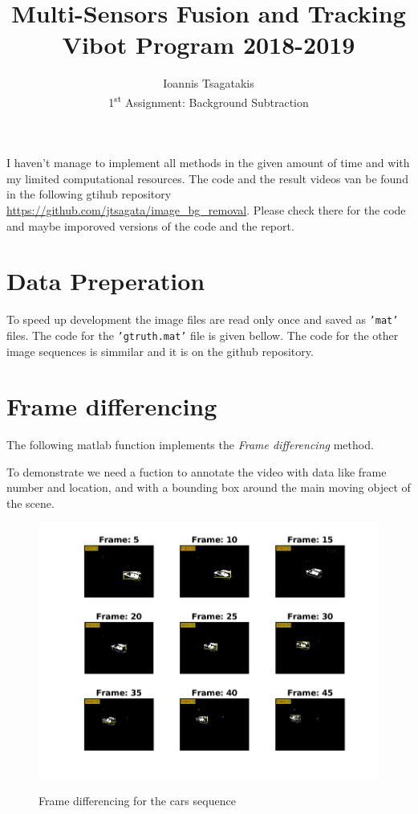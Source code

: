 \documentclass[a4paper,12pt]{article}
\begin{document}
\title{ Multi-Sensors Fusion and Tracking\\Vibot Program 2018-2019}
\author{Ioannis Tsagatakis\\
1\textsuperscript{st} Assignment: Background Subtraction} 
 
\maketitle

I haven't manage to implement all methods in the given amount of time and with my limited computational resources. The code and the result videos van be found in the following gtihub repository \url{https://github.com/jtsagata/image_bg_removal}. Please check there for the code and maybe imporoved versions of the code and the report.

\section{Data Preperation}
To speed up development the image files are read only once and saved as \texttt{'mat'} files. The code for the \texttt{'gtruth.mat'} file is given bellow. The code for the other image sequences is simmilar and it is on the github repository.



\section{Frame differencing}
The following matlab function implements the \textit{Frame differencing} method.



To demonstrate we need a fuction to annotate the video with data like frame number and location, and with a bounding box around the main moving object of the scene.

\begin{figure}[Ht]
\centering
\includegraphics{../Videos/bgsub_framediff_cars.png}
\label{fig:fdiff_cars}
\caption{Frame differencing for the cars sequence}
\end{figure}
\end{document}
